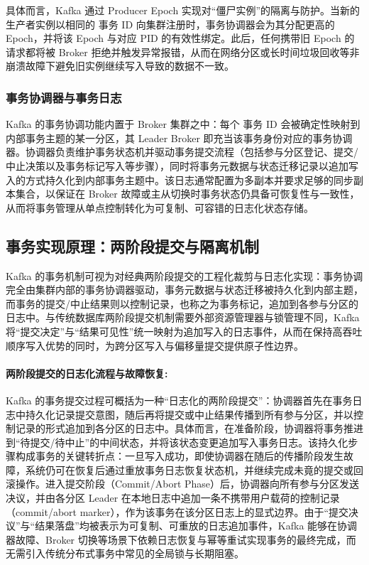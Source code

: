 具体而言，Kafka 通过 Producer Epoch 实现对“僵尸实例”的隔离与防护。当新的生产者实例以相同的 事务 ID 向集群注册时，事务协调器会为其分配更高的 Epoch，并将该 Epoch 与对应 PID 的有效性绑定。此后，任何携带旧 Epoch 的请求都将被 Broker 拒绝并触发异常报错，从而在网络分区或长时间垃圾回收等非崩溃故障下避免旧实例继续写入导致的数据不一致。

\subsubsection{事务协调器与事务日志}

Kafka 的事务协调功能内置于 Broker 集群之中：每个 事务 ID 会被确定性映射到内部事务主题的某一分区，其 Leader Broker 即充当该事务身份对应的事务协调器。协调器负责维护事务状态机并驱动事务提交流程（包括参与分区登记、提交/中止决策以及事务标记写入等步骤），同时将事务元数据与状态迁移记录以追加写入的方式持久化到内部事务主题中。该日志通常配置为多副本并要求足够的同步副本集合，以保证在 Broker 故障或主从切换时事务状态仍具备可恢复性与一致性，从而将事务管理从单点控制转化为可复制、可容错的日志化状态存储。



\subsection{事务实现原理：两阶段提交与隔离机制}

Kafka 的事务机制可视为对经典两阶段提交的工程化裁剪与日志化实现：事务协调完全由集群内部的事务协调器驱动，事务元数据与状态迁移被持久化到内部主题，而事务的提交/中止结果则以控制记录，也称之为事务标记，追加到各参与分区的日志中。与传统数据库两阶段提交机制需要外部资源管理器与锁管理不同，Kafka 将“提交决定”与“结果可见性”统一映射为追加写入的日志事件，从而在保持高吞吐顺序写入优势的同时，为跨分区写入与偏移量提交提供原子性边界。

\paragraph{两阶段提交的日志化流程与故障恢复:}
Kafka 的事务提交过程可概括为一种``日志化的两阶段提交''：协调器首先在事务日志中持久化记录提交意图，随后再将提交或中止结果传播到所有参与分区，并以控制记录的形式追加到各分区的日志中。具体而言，在准备阶段，协调器将事务推进到“待提交/待中止”的中间状态，并将该状态变更追加写入事务日志。该持久化步骤构成事务的关键转折点：一旦写入成功，即使协调器在随后的传播阶段发生故障，系统仍可在恢复后通过重放事务日志恢复状态机，并继续完成未竟的提交或回滚操作。进入提交阶段（Commit/Abort Phase）后，协调器向所有参与分区发送决议，并由各分区 Leader 在本地日志中追加一条不携带用户载荷的控制记录（commit/abort marker），作为该事务在该分区日志上的显式边界。由于“提交决议”与“结果落盘”均被表示为可复制、可重放的日志追加事件，Kafka 能够在协调器故障、Broker 切换等场景下依赖日志恢复与幂等重试实现事务的最终完成，而无需引入传统分布式事务中常见的全局锁与长期阻塞。

